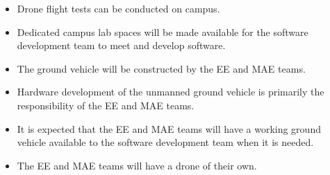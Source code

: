 
\begin{itemize}
    \item Drone flight tests can be conducted on campus.
    \item Dedicated campus lab spaces will be made available for the software development team to meet and develop software.
    \item The ground vehicle will be constructed by the EE and MAE teams.
    \item Hardware development of the unmanned ground vehicle is primarily the responsibility of the EE and MAE teams.
    \item It is expected that the EE and MAE teams will have a working ground vehicle available to the software development team when it is needed.
    \item The EE and MAE teams will have a drone of their own.
\end{itemize}
